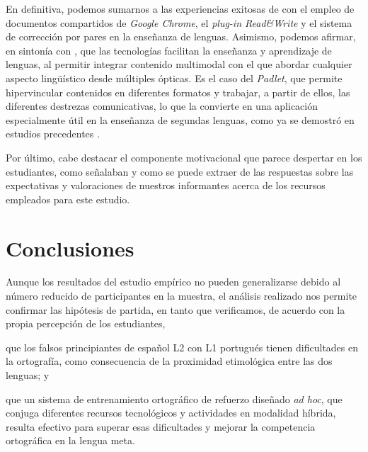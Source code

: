 \documentclass[spanish]{textolivre}
\begin{document}
En definitiva, podemos sumarnos a las experiencias exitosas de \textcite{ok_digital_2019,liou_training_2009,pim_emerging_2013,orr_assisted_2007,departamento_de_educacion_de_la_comunidad_autonoma_del_pais_vasco_propuestas_2020} con el empleo de documentos compartidos de \textit{Google Chrome}, el \textit{plug-in Read\&Write} y el sistema de corrección por pares en la enseñanza de lenguas. Asimismo, podemos afirmar, en sintonía con \textcite{vazquez-cano_nuevas_2014,garcia_tecnologias_2020,conceicao_as_2022,estevez_rionegro_tecnologias_2024}, que las tecnologías facilitan la enseñanza y aprendizaje de lenguas, al permitir integrar contenido multimodal con el que abordar cualquier aspecto lingüístico desde múltiples ópticas. Es el caso del \textit{Padlet}, que permite hipervincular contenidos en diferentes formatos y trabajar, a partir de ellos, las diferentes destrezas comunicativas, lo que la convierte en una aplicación especialmente útil en la enseñanza de segundas lenguas, como ya se demostró en estudios precedentes \cite{servio_padlet:_2022,stinga_fortaleciendo_2021,conceicao_as_2022,gonzalez_enfoque_2023}.

Por último, cabe destacar el componente motivacional que parece despertar en los estudiantes, como señalaban \textcite{palomo_tic_2006,marques_graells_impacto_2013} y como se puede extraer de las respuestas sobre las expectativas y valoraciones de nuestros informantes acerca de los recursos empleados para este estudio.

\section{Conclusiones}\label{sec-secoes}
Aunque los resultados del estudio empírico no pueden generalizarse debido al número reducido de participantes en la muestra, el análisis realizado nos permite confirmar las hipótesis de partida, en tanto que verificamos, de acuerdo con la propia percepción de los estudiantes, 
\begin{enumerate*}[label=(\roman*)]
\item que los falsos principiantes de español L2 con L1 portugués tienen dificultades en la ortografía, como consecuencia de la proximidad etimológica entre las dos lenguas; y 
\item que un sistema de entrenamiento ortográfico de refuerzo diseñado \textit{ad hoc}, que conjuga diferentes recursos tecnológicos y actividades en modalidad híbrida, resulta efectivo para superar esas dificultades y mejorar la competencia ortográfica en la lengua meta.   
\end{enumerate*}
\end{document}

